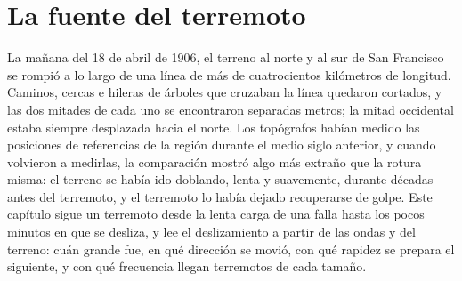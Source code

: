 \chapter{La fuente del terremoto}\label{ch:b1:earthquake-source}

La mañana del 18 de abril de 1906, el terreno al norte y al sur de San Francisco se rompió a lo largo de una línea de más de
cuatrocientos kilómetros de longitud. Caminos, cercas e hileras de árboles que cruzaban la línea quedaron cortados, y las dos mitades
de cada uno se encontraron separadas metros; la mitad occidental estaba siempre desplazada hacia el norte. Los topógrafos habían
medido las posiciones de referencias de la región durante el medio siglo anterior, y cuando volvieron a medirlas, la comparación
mostró algo más extraño que la rotura misma: el terreno se había ido doblando, lenta y suavemente, durante décadas antes del
terremoto, y el terremoto lo había dejado recuperarse de golpe. Este capítulo sigue un terremoto desde la lenta carga de una falla
hasta los pocos minutos en que se desliza, y lee el deslizamiento a partir de las ondas y del terreno: cuán grande fue, en qué
dirección se movió, con qué rapidez se prepara el siguiente, y con qué frecuencia llegan terremotos de cada tamaño.

